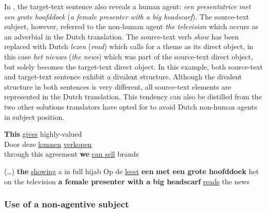 \documentclass[output=paper]{LSP/langsci}
\begin{document}
In , the target-text sentence also reveals a human agent: \textit{een presentatrice met een grote hoofddoek} (\textit{a female presenter with a big headscarf}). The source-text subject, however, referred to the non-human agent \textit{the television} which occurs as an adverbial in the Dutch translation. The source-text verb \textit{show} has been replaced with Dutch \textit{lezen} (\textit{read}) which calls for a theme as its direct object, in this case \textit{het nieuws} (\textit{the news}) which was part of the source-text direct object, but solely becomes the target-text direct object. In this example, both source-text and target-text sentence exhibit a divalent structure. Although the divalent structure in both sentences is very different, all source-text elements are represented in the Dutch translation. This tendency can also be distilled from the two other solutions translators have opted for to avoid Dutch non-human agents in subject position.             


\ea \label{ex:5:13}
\ea
\textbf{This}  \ul{gives}  highly-valued \\[1em]
\ex Door deze  \ul{kunnen}   \ul{verkopen}\\
through this agreement \textbf{we} \ul{can sell} brands
\z
\z


\ea \label{ex:5:14}
\ea
(\dots) \textbf{the}  \ul{showing} a  in full hijab
\ex
Op de  \ul{leest} \textbf{een}  \textbf{met een grote hoofddoek} het \\[.5em]
on the television \textbf{a female presenter with a big headscarf} \ul{reads} the news
\z
\z


\subsubsection{Use of a non-agentive subject} \label{sec:5:6:2:2}
\end{document}
